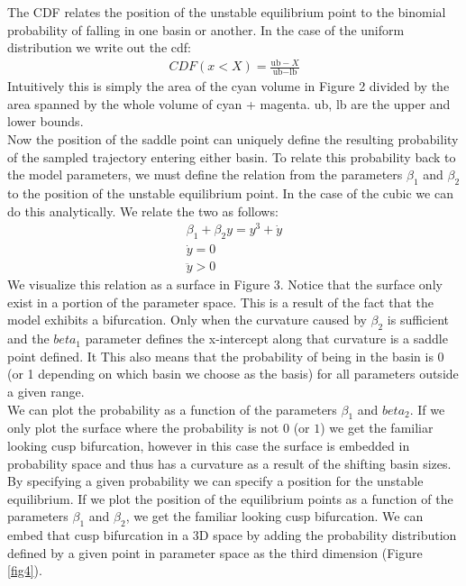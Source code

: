 \documentclass[letterpaper]{article}
\begin{document}
The CDF relates the position of the unstable equilibrium point to the 
binomial probability of falling in one basin or another. In the case of the
uniform distribution we write out the cdf:
\begin{eqnarray} 
  CDF(x<X) = \frac{\text{ub} - X}{\text{ub}-\text{lb}}
\end{eqnarray}
Intuitively this is simply the area of the cyan volume in Figure 2 divided by the 
area spanned by the whole volume of cyan + magenta. ub, lb are the upper and lower
bounds.\\
Now the position of the saddle point can uniquely define the resulting
probability of the sampled trajectory entering either basin. To relate this
probability back to the model parameters, we must define the relation from
the parameters $\beta_1$ and $\beta_2$ to the position of the unstable
equilibrium point. In the case of the cubic we can do this analytically.
We relate the two as follows:
\begin{eqnarray}
    \beta_1+\beta_2 y = y^3 + \dot{y}\\
    \dot{y} = 0\\
    \ddot{y} > 0
\end{eqnarray}
We visualize this relation as a surface in Figure 3. Notice that the surface only exist
in a portion of the parameter space. This is a result of the fact that the model exhibits
a bifurcation. Only when the curvature caused by $\beta_2$ is sufficient and the $beta_1$
parameter defines the x-intercept along that curvature is a saddle point defined. It
This also means that the probability of being in the basin is 0 (or 1 depending on
which basin we choose as the basis) for all parameters outside a given range.\\
We can plot the probability as a function of the parameters $\beta_1$ and $beta_2$.
If we only plot the surface where the probability is not $0$ (or $1$) we get the 
familiar looking cusp bifurcation, however in this case the surface is embedded in probability
space and thus has a curvature as a result of the shifting basin sizes.
By specifying a given probability we can 
specify a position for the unstable equilibrium. If we plot the position
of the equilibrium points as a function of the parameters $\beta_1$ and $\beta_2$,
we get the familiar looking cusp bifurcation. We can embed that cusp bifurcation
in a 3D space by adding the probability distribution defined by a given point in 
parameter space as the third dimension (Figure \ref{fig4}).
\end{document}
